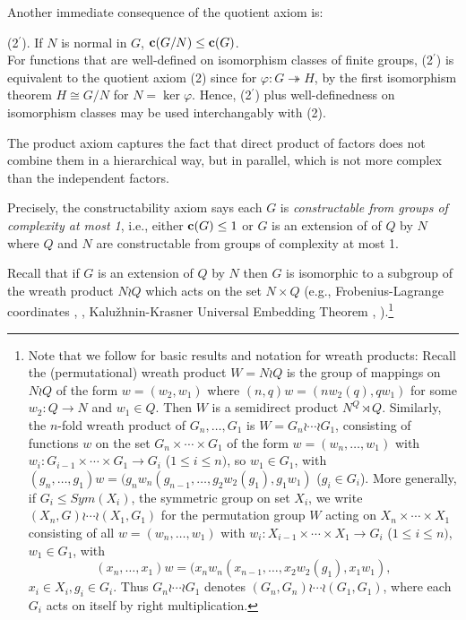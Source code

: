 \documentclass[a4paper,11pt]{amsart}
\theoremstyle{definition}
\renewcommand{\c}{\mbox{\bf c}}
\newcommand{\sur}{\twoheadrightarrow}
\newcommand{\1}{{\mathbf 1}}
\begin{document}
Another immediate consequence
of the quotient axiom is:

(2$^\prime$). If $N$ is normal in $G$, $\c(G/N) \leq \c(G) $. \\
For functions that are well-defined on isomorphism classes of finite groups, (2$^\prime$) is equivalent to the quotient axiom (2) since for $\varphi: G\sur H$,  by the first isomorphism theorem $H\cong G/N$ for $N=\ker \varphi$.  Hence, (2$^\prime$) plus well-definedness on isomorphism classes may be used interchangably with (2). 

The product axiom captures the fact that direct product of factors does not combine them in a hierarchical way, but in parallel,  which is not more complex than the independent factors. 


Precisely, the constructability axiom says each $G$ is {\em constructable from groups of complexity at most 1}, i.e., either $\c(G)\leq 1$ or $G$ is an extension of of $Q$ by $N$ where $Q$ and $N$ are constructable from groups of complexity at most 1. 

   
Recall that if $G$ is an extension of $Q$ by $N$ then $G$ is isomorphic to a subgroup of the wreath product $N\wr Q$ which acts on the set $N\times Q$  (e.g., Frobenius-Lagrange coordinates \cite[pp.~29--33]{baumslag},  \cite[Theorem~1.17]{AutomataNetworks},  Kalu\v{z}hnin-Krasner Universal Embedding Theorem \cite{KrasnerKaloujnine}, \cite[Theorem 2.6A]{DixonMortimer}).\footnote{Note that 
we follow  \cite{wildbook,qtheory,AutomataNetworks} for basic results and notation for wreath products: 
Recall the (permutational) wreath product $W= N\wr Q$ is the group of mappings on $N\wr Q$ of the form $w=(w_2,w_1)$ where
$(n,q)w=(n w_2(q), q w_1)$ for some $w_2: Q\rightarrow N$ and $w_1\in Q$. Then $W$ is a semidirect product $N^Q \rtimes Q$.
Similarly, the $n$-fold wreath product of $G_n, \ldots, G_1$ is $W= G_n \wr \cdots \wr G_1$,  consisting of functions
$w$ on the set $G_n\times \cdots \times G_1$ of the form $w=(w_n, \ldots, w_1)$ with $w_i: G_{i-1}\times \cdots \times G_1 \rightarrow G_i$ ($1\leq i \leq n)$, so  $w_1\in G_1$, with  $(g_n, \ldots , g_1) w= (g_n w_n(g_{n-1},\ldots, g_2 w_2(g_1), g_1 w_1)$ ($g_i \in G_i$).  
More generally, if $G_i \leq Sym(X_i)$, the symmetric group on set $X_i$, we write
$(X_n, G) \wr \cdots \wr (X_1, G_1)$ for the permutation group $W$ acting on $X_n\times \cdots \times X_1$ consisting of all $w=(w_n, \ldots, w_1)$ with $w_i: X_{i-1}\times \cdots \times X_1 \rightarrow G_i$ ($1\leq i \leq n)$,  $w_1\in G_1$, with  
$$(x_n, \ldots , x_1) w= (x_n w_n(x_{n-1},\ldots, x_2 w_2(g_1), x_1 w_1),$$ $x_i\in X_i, g_i\in G_i$. Thus $G_n \wr \cdots \wr G_1$ denotes $(G_n,G_n) \wr \cdots \wr (G_1,G_1)$, where each $G_i$ acts on itself by right multiplication.}
\end{document}
